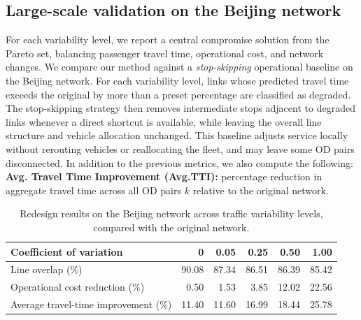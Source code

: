 \documentclass[11pt,a4paper]{article} %
\begin{document}
\subsection{Large-scale validation on the Beijing network}
For each variability level, we report a central compromise solution from the Pareto set, balancing passenger travel time, operational cost, and network changes. We compare our method against a \emph{stop-skipping} operational baseline on the Beijing network. 
%
For each variability level, links whose predicted travel time exceeds the original by more than a preset percentage are classified as degraded. The stop-skipping strategy then removes intermediate stops adjacent to degraded links whenever a direct shortcut is available, while leaving the overall line structure and vehicle allocation unchanged.  
%
This baseline adjusts service locally without rerouting vehicles or reallocating the fleet, and may leave some OD pairs disconnected. In addition to the previous metrics, we also compute the following: \textbf{Avg. Travel Time Improvement (Avg.TTI):} percentage reduction in aggregate travel time across all OD pairs $k$ relative to the original network.


\begin{table}[htbp]
\caption{Redesign results on the Beijing network across traffic variability levels, compared with the original network.}\label{tab:beijing_cvs}
\centering
\begin{tabular}{lrrrrr}\toprule
Coefficient of variation & 0 & 0.05 & 0.25 & 0.50 & 1.00 \\
\midrule
Line overlap (\%) & 90.08 & 87.34 & 86.51 & 86.39 & 85.42 \\
Operational cost reduction (\%) & 0.50 & 1.53 & 3.85 & 12.02 & 22.56 \\
Average travel-time improvement (\%) & 11.40 & 11.60 & 16.99 & 18.44 & 25.78 \\
\bottomrule\end{tabular}
\end{table}
\end{document}
